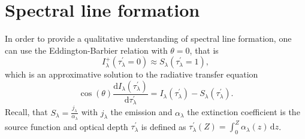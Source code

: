 \documentclass[a4paper,12pt]{report}
\def\lk#1{{\color{black}{#1}}}
\begin{document}

\section{Spectral line formation}
In order to provide a qualitative understanding of spectral line formation, one can use the Eddington-Barbier relation with $\theta = 0$, that is \begin{equation}
I_\lambda^+(\tau_\lambda^\prime = 0) \approx S_\lambda(\tau_\lambda^\prime = 1),
\end{equation} which is an approximative solution to the radiative transfer equation \begin{equation}
\cos(\theta)\frac{\mathrm{d}I_\lambda(\tau_\lambda^\prime)}{\mathrm{d}\tau_\lambda^\prime} = I_\lambda(\tau_\lambda^\prime) - S_\lambda(\tau_\lambda^\prime).
\end{equation} Recall, that $S_\lambda = \frac{j_\lambda}{\alpha_\lambda}$ with $j_\lambda$ the emission and $\alpha_\lambda$ the extinction coefficient is the source function and \lk{that the} optical depth $\tau_\lambda^\prime$ is defined as $\tau_\lambda^\prime(Z)  = \int_{0}^{Z}\alpha_\lambda(z)\,\mathrm{d}z$.
\end{document}
